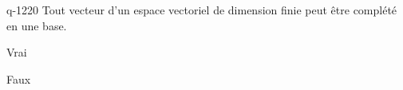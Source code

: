 \begin{truefalse}{q-1220}
Tout vecteur d'un espace vectoriel de dimension finie peut être complété en une base.
\item Vrai
\item* Faux
\end{truefalse}

